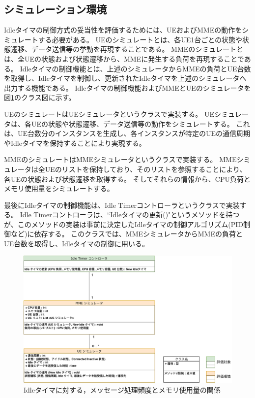 \documentclass[a4j]{ujarticle}
\begin{document}
\subsection{シミュレーション環境}
Idleタイマの制御方式の妥当性を評価するためには、UEおよびMMEの動作をシミュレートする必要がある。
UEのシミュレートとは、各UE1台ごとの状態や状態遷移、データ送信等の挙動を再現することである。
MMEのシミュレートとは、全UEの状態および状態遷移から、MMEに発生する負荷を再現することである。
Idleタイマの制御機能とは、上述のシミュレータからMMEの負荷とUE台数を取得し、Idleタイマを制御し、更新されたIdleタイマを上述のシミュレータへ出力する機能である。
Idleタイマの制御機能およびMMEとUEのシミュレータを図\ref{Simulation_UML}のクラス図に示す。

UEのシミュレートはUEシミュレータというクラスで実装する。
UEシミュレータは、各UEの状態や状態遷移、データ送信等の動作をシミュレートする。
これは、UE台数分のインスタンスを生成し、各インスタンスが特定のUEの通信周期やIdleタイマを保持することにより実現する。

MMEのシミュレートはMMEシミュレータというクラスで実装する。
MMEシミュレータは全UEのリストを保持しており、そのリストを参照することにより、各UEの状態および状態遷移を取得する。
そしてそれらの情報から、CPU負荷とメモリ使用量をシミュレートする。

最後にIdleタイマの制御機能は、Idle Timerコントローラというクラスで実装する。
Idle Timerコントローラは、``Idleタイマの更新()"というメソッドを持つが、このメソッドの実装は事前に決定したIdleタイマの制御アルゴリズム(PID制御など)に依存する。
このクラスでは、MMEシミュレータからMMEの負荷とUE台数を取得し、Idleタイマの制御に用いる。



\begin{figure}[htbp]
  \centering
  \includegraphics[width=1.0\hsize]{Simulation_UML.pdf}
  \caption{Idleタイマに対する，メッセージ処理頻度とメモリ使用量の関係}
  \label{Simulation_UML}
\end{figure}
\end{document}
